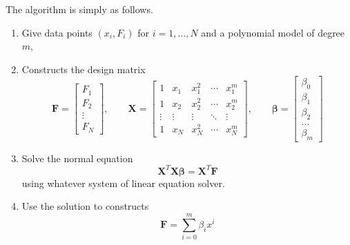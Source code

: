 \documentclass[../../../main.tex]{subfiles}
\begin{document}
The algorithm is simply as follows.
\begin{enumerate}
    \item Give data points \((x_i, F_i)\) for \(i = 1, \dots, N\) and a polynomial model of degree \(m\),
    \item Constructs the design matrix
          \begin{equation*}
              \mathbf{F} =
              \begin{bmatrix}
                  F_1 \\ F_2 \\ \vdots \\ F_N
              \end{bmatrix},
              \qquad
              \mathbf{X} =
              \begin{bmatrix}
                  1      & x_1    & x_1^2  & \cdots & x_1^m  \\
                  1      & x_2    & x_2^2  & \cdots & x_2^m  \\
                  \vdots & \vdots & \vdots & \ddots & \vdots \\
                  1      & x_N    & x_N^2  & \cdots & x_N^m
              \end{bmatrix},
              \qquad
              \boldsymbol{\beta} =\begin{bmatrix}
                  \beta_0 \\ \beta_1 \\ \beta_2\\ \ldots \\ \beta_m
              \end{bmatrix}
          \end{equation*}
    \item Solve the normal equation
          \begin{equation*}
              \mathbf{X}^{T}\mathbf{X}\boldsymbol{\beta} = \mathbf{X}^{T}\mathbf{F}
          \end{equation*}
          using whatever system of linear equation solver.
    \item Use the solution to constructs
          \begin{equation*}
              \mathbf{F} = \sum_{i=0}^{m} \beta_i x^i
          \end{equation*}
\end{enumerate}
\end{document}

